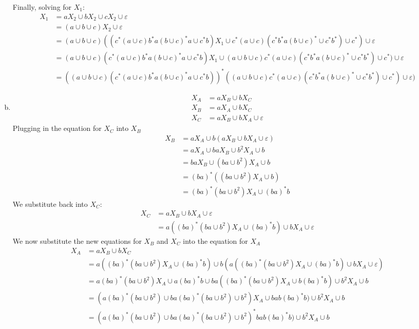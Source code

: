 \begin{solution}
\begin{enumerate}[(a)]
    Finally, solving for $X_1$:
    \begin{align*}
        X_1 &= aX_2\cup bX_2\cup cX_2\cup\varepsilon\\
            &= (a\cup b\cup c)X_2\cup\varepsilon\\
            &= (a\cup b\cup c)((c^*(a\cup c)b^*a(b\cup c)^*a\cup c^*b)X_1\cup c^*(a\cup c)(c^*b^*a(b\cup c)^*\cup c^*b^*)\cup c^*)\cup\varepsilon\\
            &= (a\cup b\cup c)(c^*(a\cup c)b^*a(b\cup c)^*a\cup c^*b)X_1\cup (a\cup b\cup c)c^*(a\cup c)(c^*b^*a(b\cup c)^*\cup c^*b^*)\cup c^*)\cup\varepsilon\\
            &= \left((a\cup b\cup c)(c^*(a\cup c)b^*a(b\cup c)^*a\cup c^*b)\right)^*((a\cup b\cup c)c^*(a\cup c)(c^*b^*a(b\cup c)^*\cup c^*b^*)\cup c^*)\cup\varepsilon)
    \end{align*}
        \item
    \begin{align*}
        X_A &= aX_B\cup bX_C\\
        X_B &= aX_A\cup bX_C\\
        X_C &= aX_B\cup bX_A\cup\varepsilon
    \end{align*}
    Plugging in the equation for $X_C$ into $X_B$
    \begin{align*}
        X_B &= aX_A\cup b(aX_B\cup bX_A\cup\varepsilon)\\
            &= aX_A\cup baX_B\cup b^2X_A\cup b\\
            &= baX_B\cup (ba\cup b^2)X_A\cup b\\
            &= (ba)^*((ba\cup b^2)X_A\cup b)\\
            &= (ba)^*(ba\cup b^2)X_A\cup (ba)^*b
    \end{align*}
    We substitute back into $X_C$:
    \begin{align*}
        X_C &= aX_B\cup bX_A\cup\varepsilon\\
            &= a((ba)^*(ba\cup b^2)X_A\cup (ba)^*b)\cup bX_A\cup\varepsilon
    \end{align*}
    We now substitute the new equations for $X_B$ and $X_C$ into the equation for $X_A$
    \begin{align*}
        X_A &= aX_B\cup bX_C\\
            &= a((ba)^*(ba\cup b^2)X_A\cup (ba)^*b)\cup b(a((ba)^*(ba\cup b^2)X_A\cup (ba)^*b)\cup bX_A\cup\varepsilon)\\
            &= a(ba)^*(ba\cup b^2)X_A\cup a(ba)^*b\cup ba((ba)^*(ba\cup b^2)X_A\cup b(ba)^*b)\cup b^2X_A\cup b\\
            &= (a(ba)^*(ba\cup b^2)\cup ba(ba)^*(ba\cup b^2)\cup b^2)X_A\cup bab(ba)^*b)\cup b^2X_A\cup b\\
            &= (a(ba)^*(ba\cup b^2)\cup ba(ba)^*(ba\cup b^2)\cup b^2)^*bab(ba)^*b)\cup b^2X_A\cup b
    \end{align*}
    \end{enumerate}
\end{solution}

